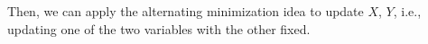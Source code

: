 \documentclass[letterpaper]{article}
\begin{document}


Then, we can apply the alternating minimization idea to update $X$, $Y$, i.e., updating one of the two variables with the other fixed.
\end{document}
